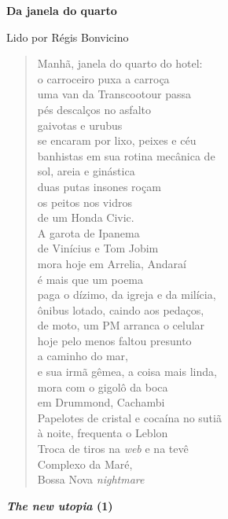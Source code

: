 \pagebreak

\textbf{Da janela do quarto}

Lido por Régis Bonvicino

\begin{verse}
Manhã, janela do quarto do hotel:\\
o carroceiro puxa a carroça\\
uma van da Transcootour passa\\
pés descalços no asfalto\\[5pt]
gaivotas e urubus\\
se encaram por lixo, peixes e céu\\
banhistas em sua rotina mecânica de\\
sol, areia e ginástica\\[5pt]
duas putas insones roçam\\
os peitos nos vidros\\
de um Honda Civic.\\
A garota de Ipanema\\[5pt]
de Vinícius e Tom Jobim\\
mora hoje em Arrelia, Andaraí\\
é mais que um poema\\
paga o dízimo, da igreja e da milícia,\\[5pt]
ônibus lotado, caindo aos pedaços,\\
de moto, um PM arranca o celular\\
hoje pelo menos faltou presunto\\
a caminho do mar,\\[5pt]
e sua irmã gêmea, a coisa mais linda,\\
mora com o gigolô da boca\\
em Drummond, Cachambi\\
Papelotes de cristal e cocaína no sutiã\\[5pt]
à noite, frequenta o Leblon\\
Troca de tiros na \emph{web} e na tevê\\
Complexo da Maré,\\
Bossa Nova \emph{nightmare}
\end{verse}


\pagebreak

\textbf{\emph{The new utopia} (1)}


